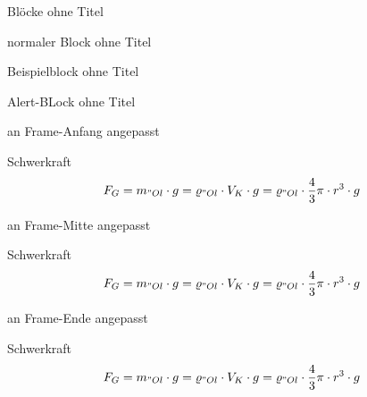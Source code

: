\begin{frame}{Blöcke ohne Titel}
    \begin{block}{}
        normaler Block ohne Titel
    \end{block}
    \begin{exampleblock}{}
        Beispielblock ohne Titel
    \end{exampleblock}
    \begin{alertblock}{}
        Alert-BLock ohne Titel
    \end{alertblock}
\end{frame}

\begin{frame}[t]{an Frame-Anfang angepasst}
    \begin{block}{Schwerkraft}
        \begin{align*}
            F_G = m_{"Ol}\cdot g = \varrho_{"Ol} \cdot V_K \cdot g = \varrho_{"Ol} \cdot \frac{4}{3}\pi \cdot r^3 \cdot g 
        \end{align*}
    \end{block}
\end{frame}

\begin{frame}[c]{an Frame-Mitte angepasst}
    \begin{block}{Schwerkraft}
        \begin{align*}
            F_G = m_{"Ol}\cdot g = \varrho_{"Ol} \cdot V_K \cdot g = \varrho_{"Ol} \cdot \frac{4}{3}\pi \cdot r^3 \cdot g 
        \end{align*}
    \end{block}
\end{frame}

\begin{frame}[b]{an Frame-Ende angepasst}
    \begin{block}{Schwerkraft}
        \begin{align*}
            F_G = m_{"Ol}\cdot g = \varrho_{"Ol} \cdot V_K \cdot g = \varrho_{"Ol} \cdot \frac{4}{3}\pi \cdot r^3 \cdot g 
        \end{align*}
    \end{block}
\end{frame}

